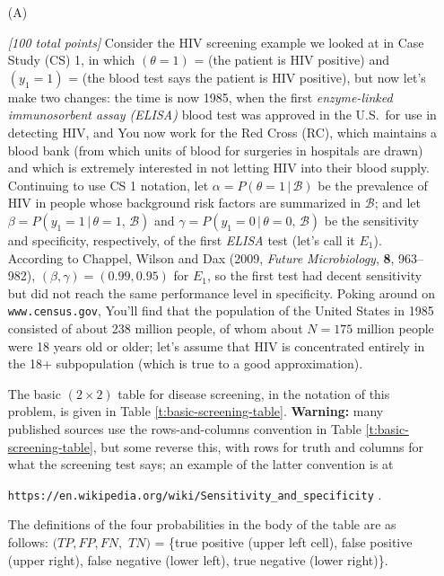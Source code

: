 \documentclass[12pt]{article}
\newcommand{\given}{\, | \,}
\newcommand{\given}{\, | \,}
\begin{document}
\begin{itemize}

\item[(A)]

\textit{[100 total points]} Consider the HIV screening example we looked at in Case Study (CS) 1, in which $( \theta = 1 )$ = (the patient is HIV positive) and $( y_1 = 1 )$ = (the blood test says the patient is HIV positive), but now let's make two changes: the time is now 1985, when the first \textit{enzyme-linked immunosorbent assay (ELISA)} blood test was approved in the U.S.~for use in detecting HIV, and You now work for the Red Cross (RC), which maintains a blood bank (from which units of blood for surgeries in hospitals are drawn) and which is extremely interested in not letting HIV into their blood supply. Continuing to use CS 1 notation, let $\alpha = P ( \theta = 1 \given \mathcal{ B } )$ be the prevalence of HIV in people whose background risk factors are summarized in $\mathcal{ B }$; and let $\beta = P ( y_1 = 1 \given \theta = 1 , \, \mathcal{ B } )$ and $\gamma = P ( y_1 = 0 \given \theta = 0 , \, \mathcal{ B })$ be the sensitivity and specificity, respectively, of the first \textit{ELISA} test (let's call it $E_1$). According to Chappel, Wilson and Dax (2009, \textit{Future Microbiology}, \textbf{8}, 963--982), $( \beta, \gamma ) = ( 0.99, 0.95 )$ for $E_1$, so the first test had decent sensitivity but did not reach the same performance level in specificity. Poking around on \texttt{www.census.gov}, You'll find that the population of the United States in 1985 consisted of about 238 million people, of whom about $N = 175$ million people were 18 years old or older; let's assume that HIV is concentrated entirely in the 18+ subpopulation (which is true to a good approximation). 

The basic $( 2 \times 2 )$ table for disease screening, in the notation of this problem, is given in Table \ref{t:basic-screening-table}. \textbf{Warning:} many published sources use the rows-and-columns convention in Table \ref{t:basic-screening-table}, but some reverse this, with rows for truth and columns for what the screening test says; an example of the latter convention is at 

\hspace*{0.25in} \texttt{https://en.wikipedia.org/wiki/Sensitivity\_and\_specificity} . 

The definitions of the four probabilities in the body of the table are as follows: $( TP, FP, FN,$ $TN )$ = \{true positive (upper left cell), false positive (upper right), false negative (lower left), true negative (lower right)\}.


\end{itemize}
\end{document}
